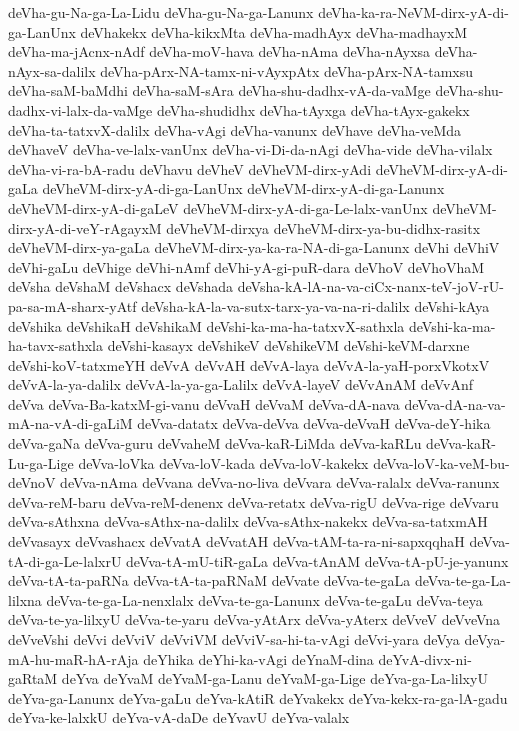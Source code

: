 {deVha-gu-Na-ga-La-Lidu
deVha-gu-Na-ga-Lanunx
deVha-ka-ra-NeVM-dirx-yA-di-ga-LanUnx
deVhakekx
deVha-kikxMta
deVha-madhAyx
deVha-madhayxM
deVha-ma-jAcnx-nAdf
deVha-moV-hava
deVha-nAma
deVha-nAyxsa
deVha-nAyx-sa-dalilx
deVha-pArx-NA-tamx-ni-vAyxpAtx
deVha-pArx-NA-tamxsu
deVha-saM-baMdhi
deVha-saM-sAra
deVha-shu-dadhx-vA-da-vaMge
deVha-shu-dadhx-vi-lalx-da-vaMge
deVha-shudidhx
deVha-tAyxga
deVha-tAyx-gakekx
deVha-ta-tatxvX-dalilx
deVha-vAgi
deVha-vanunx
deVhave
deVha-veMda
deVhaveV
deVha-ve-lalx-vanUnx
deVha-vi-Di-da-nAgi
deVha-vide
deVha-vilalx
deVha-vi-ra-bA-radu
deVhavu
deVheV
deVheVM-dirx-yAdi
deVheVM-dirx-yA-di-gaLa
deVheVM-dirx-yA-di-ga-LanUnx
deVheVM-dirx-yA-di-ga-Lanunx
deVheVM-dirx-yA-di-gaLeV
deVheVM-dirx-yA-di-ga-Le-lalx-vanUnx
deVheVM-dirx-yA-di-veY-rAgayxM
deVheVM-dirxya
deVheVM-dirx-ya-bu-didhx-rasitx
deVheVM-dirx-ya-gaLa
deVheVM-dirx-ya-ka-ra-NA-di-ga-Lanunx
deVhi
deVhiV
deVhi-gaLu
deVhige
deVhi-nAmf
deVhi-yA-gi-puR-dara
deVhoV
deVhoVhaM
deVsha
deVshaM
deVshacx
deVshada
deVsha-kA-lA-na-va-ciCx-nanx-teV-joV-rU-pa-sa-mA-sharx-yAtf
deVsha-kA-la-va-sutx-tarx-ya-va-na-ri-dalilx
deVshi-kAya
deVshika
deVshikaH
deVshikaM
deVshi-ka-ma-ha-tatxvX-sathxla
deVshi-ka-ma-ha-tavx-sathxla
deVshi-kasayx
deVshikeV
deVshikeVM
deVshi-keVM-darxne
deVshi-koV-tatxmeYH
deVvA
deVvAH
deVvA-laya
deVvA-la-yaH-porxVkotxV
deVvA-la-ya-dalilx
deVvA-la-ya-ga-Lalilx
deVvA-layeV
deVvAnAM
deVvAnf
deVva
deVva-Ba-katxM-gi-vanu
deVvaH
deVvaM
deVva-dA-nava
deVva-dA-na-va-mA-na-vA-di-gaLiM
deVva-datatx
deVva-deVva
deVva-deVvaH
deVva-deY-hika
deVva-gaNa
deVva-guru
deVvaheM
deVva-kaR-LiMda
deVva-kaRLu
deVva-kaR-Lu-ga-Lige
deVva-loVka
deVva-loV-kada
deVva-loV-kakekx
deVva-loV-ka-veM-bu-deVnoV
deVva-nAma
deVvana
deVva-no-liva
deVvara
deVva-ralalx
deVva-ranunx
deVva-reM-baru
deVva-reM-denenx
deVva-retatx
deVva-rigU
deVva-rige
deVvaru
deVva-sAthxna
deVva-sAthx-na-dalilx
deVva-sAthx-nakekx
deVva-sa-tatxmAH
deVvasayx
deVvashacx
deVvatA
deVvatAH
deVva-tAM-ta-ra-ni-sapxqqhaH
deVva-tA-di-ga-Le-lalxrU
deVva-tA-mU-tiR-gaLa
deVva-tAnAM
deVva-tA-pU-je-yanunx
deVva-tA-ta-paRNa
deVva-tA-ta-paRNaM
deVvate
deVva-te-gaLa
deVva-te-ga-La-lilxna
deVva-te-ga-La-nenxlalx
deVva-te-ga-Lanunx
deVva-te-gaLu
deVva-teya
deVva-te-ya-lilxyU
deVva-te-yaru
deVva-yAtArx
deVva-yAterx
deVveV
deVveVna
deVveVshi
deVvi
deVviV
deVviVM
deVviV-sa-hi-ta-vAgi
deVvi-yara
deVya
deVya-mA-hu-maR-hA-rAja
deYhika
deYhi-ka-vAgi
deYnaM-dina
deYvA-divx-ni-gaRtaM
deYva
deYvaM
deYvaM-ga-Lanu
deYvaM-ga-Lige
deYva-ga-La-lilxyU
deYva-ga-Lanunx
deYva-gaLu
deYva-kAtiR
deYvakekx
deYva-kekx-ra-ga-lA-gadu
deYva-ke-lalxkU
deYva-vA-daDe
deYvavU
deYva-valalx
}
